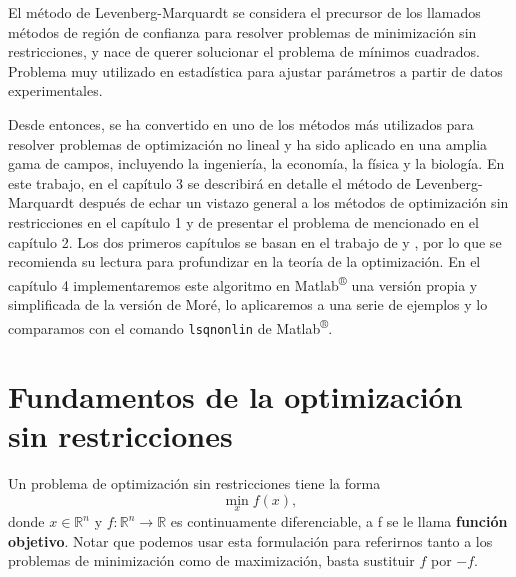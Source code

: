 \documentclass[11pt,a4paper]{book}
\theoremstyle{definition}
\theoremstyle{remark}
\def\code#1{\texttt{#1}}
\begin{document}
El método de Levenberg-Marquardt se considera el precursor de los llamados métodos de región de confianza para resolver problemas de minimización sin restricciones, y nace de querer solucionar el problema de mínimos cuadrados. Problema muy utilizado en estadística para ajustar parámetros a partir de datos experimentales.

Desde entonces, se ha convertido en uno de los métodos más utilizados para resolver problemas de optimización no lineal y ha sido aplicado en una amplia gama de campos, incluyendo la ingeniería, la economía, la física y la biología. En este trabajo, en el capítulo 3 se describirá en detalle el método de Levenberg-Marquardt después de echar un vistazo general a los métodos de optimización sin restricciones en el capítulo 1 y de presentar el problema de mencionado en el capítulo 2. Los dos primeros capítulos se basan en el trabajo de \cite{Nocedal2006-kh} y \cite{Sun2006-au}, por lo que se recomienda su lectura para profundizar en la teoría de la optimización.
En el capítulo 4 implementaremos este algoritmo en Matlab\textsuperscript{®} una versión propia y simplificada de la versión de Moré, lo aplicaremos a una serie de ejemplos y lo comparamos con el comando \code{lsqnonlin} de Matlab\textsuperscript{®}.



\mainmatter




\chapter{Fundamentos de la optimización sin restricciones}

Un problema de optimización sin restricciones tiene la forma 
\begin{equation}
	\min_{x}f\left(x\right),
	\label{eq:minf}
\end{equation}
donde $x\in\mathbb{R}^{n}$ y $f : \mathbb{R}^{n} \rightarrow \mathbb{R}$ es continuamente
diferenciable, a f se le llama \textbf{función objetivo}. 
Notar que podemos usar esta formulación para referirnos tanto a los problemas de minimización
como de maximización, basta sustituir $f$ por $-f$. 
\end{document}

